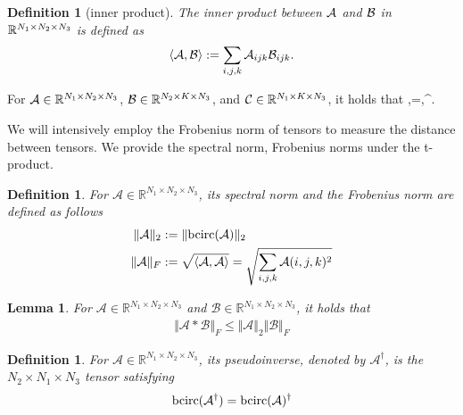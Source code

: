 \documentclass[11pt]{article}
\newtheorem{definition}[theorem]{Definition}
\newtheorem{lemma}[theorem]{Lemma}
\def\fm#1{\mathcal{#1}}
\def\r{\mathbb{R}}
\begin{document}
\begin{definition}[inner product]
The inner product between $\mathcal A$ and $\mathcal B$ in $\mathbb R^{N_1\times N_2\times N_3}$ is defined as $$\langle\mathcal A,\mathcal B\rangle:=\sum_{i,j,k}\mathcal A_{ijk}\mathcal B_{ijk}.$$ 
\end{definition}

For $\mathcal A\in\mathbb R^{N_1\times N_2\times N_3}$, $\mathcal B\in\mathbb R^{N_2\times K\times N_3}$, and $\mathcal C\in\mathbb R^{N_1\times K\times N_3}$, it holds that \beq\label{tran}\la\mcala*\mcalb,\mcalc\ra=\la\mcalb,\mcala^\top*\mcalc\ra.\eeq

We will intensively employ the Frobenius norm of tensors to measure the distance between tensors. We  provide the spectral norm, Frobenius norms under the t-product.
\begin{definition}  For $\fm A \in \r^{N_1 \times N_2 \times N_3}$, its spectral norm and the Frobenius norm are defined as follows
\begin{align}
    \Vert \fm A \Vert_2 &  := \Vert \bcirc (\fm A ) \Vert_2\\
    \Vert \fm A \Vert_F &:= \sqrt{\langle \fm A , \fm A \rangle} = \sqrt{\sum_{i,j,k}\fm A(i,j,k)^2}
\end{align}
\end{definition}
\begin{lemma}\label{lem:submult}
    For $\fm A\in \r^{N_1\times N_2 \times N_3}$ and $\fm B\in \r^{N_1\times N_2 \times N_3}$, it holds that
    \begin{align}
        \Vert \fm A * \fm B \Vert_F\leq \Vert \fm A \Vert_2 \Vert \fm B \Vert_F
    \end{align}
\end{lemma}
\begin{definition} For $\fm A\in \r^{N_1\times N_2\times N_3}$, its pseudoinverse, denoted by $\fm A^\dagger$, is the $N_2\times N_1\times N_3$ tensor satisfying
\begin{align}
    \bcirc(\fm A^\dagger) = \bcirc(\fm A )^\dagger
\end{align}
\end{definition}
\end{document}
